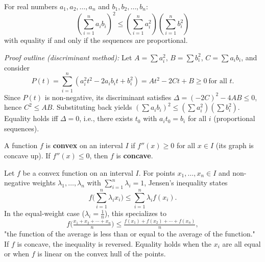 \documentclass[12pt]{article}
\begin{document}
\begin{theorembox}[title={\bfseries Cauchy-Schwarz Inequality}]
For real numbers $a_1, a_2, \ldots, a_n$ and $b_1, b_2, \ldots, b_n$:
\[
\left(\sum_{i=1}^{n} a_i b_i\right)^2 \le \left(\sum_{i=1}^{n} a_i^2\right)\left(\sum_{i=1}^{n} b_i^2\right)
\]
with equality if and only if the sequences are proportional.
\end{theorembox}

\textit{Proof outline (discriminant method):}
Let $A=\sum a_i^2$, $B=\sum b_i^2$, $C=\sum a_i b_i$, and consider
$$P(t)=\sum_{i=1}^{n}(a_i^2 t^2-2a_i b_i t+b_i^2)=At^2-2Ct+B\ge 0\ \text{for all }t.$$ Since $P(t)$ is non-negative, its discriminant satisfies $\Delta=(-2C)^2-4AB\le 0$, hence $C^2\le AB$. Substituting back yields $\left(\sum a_i b_i\right)^2\le\left(\sum a_i^2\right)\left(\sum b_i^2\right)$. Equality holds iff $\Delta=0$, i.e., there exists $t_0$ with $a_i t_0=b_i$ for all $i$ (proportional sequences).

\begin{definitionbox}[title={\bfseries Convex Function}]
A function $f$ is \textbf{convex} on an interval $I$ if $f''(x) \ge 0$ for all $x \in I$ (its graph is concave up). If $f''(x) \le 0$, then $f$ is \textbf{concave}.
\end{definitionbox}

\begin{theorembox}[title={\bfseries Jensen's Inequality}]
Let $f$ be a convex function on an interval $I$. 
For points $x_1,\dots,x_n\in I$ and non-negative weights 
$\lambda_1,\dots,\lambda_n$ with $\sum_{i=1}^n\lambda_i=1$, Jensen's inequality states
\[
f\Big(\sum_{i=1}^n\lambda_i x_i\Big) \le \sum_{i=1}^n\lambda_i f(x_i).
\]
In the equal-weight case ($\lambda_i = \tfrac{1}{n}$), this specializes to
\[
 f\Big(\tfrac{x_1 + x_2 + \cdots + x_n}{n}\Big) \le \tfrac{f(x_1) + f(x_2) + \cdots + f(x_n)}{n},
\]
"the function of the average is less than or equal to the average of the function."
If $f$ is concave, the inequality is reversed. 
Equality holds when the $x_i$ are all equal or when $f$ is linear on the convex hull of the points.
\end{theorembox}
\end{document}
